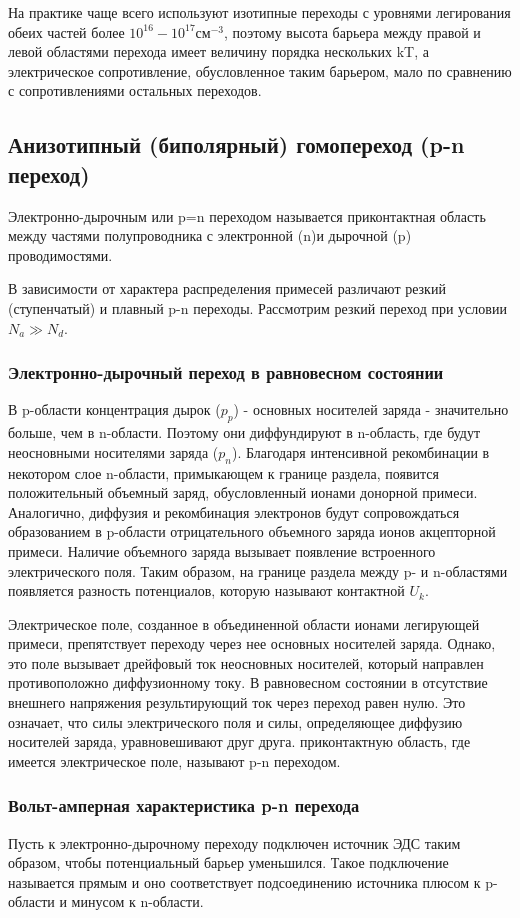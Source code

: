 На практике чаще всего используют изотипные переходы с уровнями легирования обеих частей более $10^{16}-10^{17} \text{см}^{-3}$, поэтому высота барьера между правой и левой областями перехода имеет величину порядка нескольких kT, а электрическое сопротивление, обусловленное таким барьером, мало по сравнению с сопротивлениями остальных переходов.  
\subsection{Анизотипный (биполярный) гомопереход (p-n переход)}
Электронно-дырочным или p=n переходом называется приконтактная область между частями полупроводника с электронной (n)и дырочной (p) проводимостями. 

В зависимости от характера распределения примесей различают резкий (ступенчатый) и плавный p-n переходы. Рассмотрим резкий переход при условии $N_a \gg N_d$.

\subsubsection{Электронно-дырочный переход в равновесном состоянии}
В p-области концентрация дырок ($p_p$) - основных носителей заряда - значительно больше, чем в n-области. Поэтому они диффундируют в n-область, где будут неосновными носителями заряда ($p_n$). Благодаря интенсивной рекомбинации в некотором слое n-области, примыкающем к границе раздела, появится положительный объемный заряд, обусловленный ионами донорной примеси. Аналогично, диффузия и рекомбинация электронов будут сопровождаться образованием в p-области отрицательного объемного заряда ионов акцепторной примеси. Наличие объемного заряда вызывает появление встроенного электрического поля. Таким образом, на границе раздела между p- и n-областями появляется разность потенциалов, которую называют контактной $U_k$.

Электрическое поле, созданное в объединенной области ионами легирующей примеси, препятствует переходу через нее основных носителей заряда. Однако, это поле вызывает дрейфовый ток неосновных носителей, который направлен противоположно диффузионному току. В равновесном состоянии в отсутствие внешнего напряжения результирующий ток через переход равен нулю. Это означает, что силы электрического поля и силы, определяющее диффузию носителей заряда, уравновешивают друг друга. приконтактную область, где имеется электрическое поле, называют p-n переходом.

\subsubsection{Вольт-амперная характеристика p-n перехода}
Пусть к электронно-дырочному переходу подключен источник ЭДС таким образом, чтобы потенциальный барьер уменьшился. Такое подключение называется прямым и оно соответствует подсоединению источника плюсом к p-области и минусом к n-области. 

